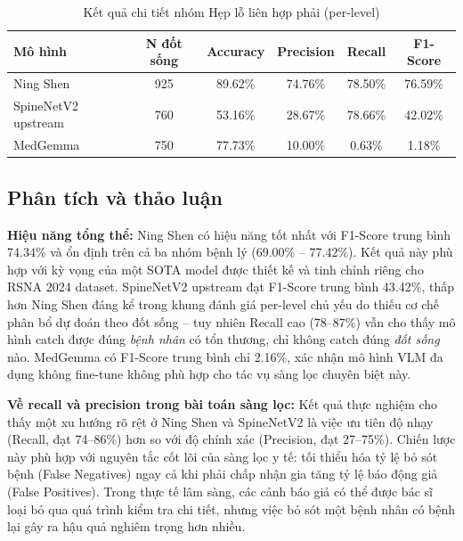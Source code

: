 \begin{table}[h!]
    \centering
    \caption{Kết quả chi tiết nhóm Hẹp lỗ liên hợp phải (per-level)}
    \label{tab:nfn_right_metrics}
    \renewcommand{\arraystretch}{1.2}
    \begin{tabular}{lccccc}
        \toprule
        \textbf{Mô hình} & \textbf{N đốt sống} & \textbf{Accuracy} & \textbf{Precision} & \textbf{Recall} & \textbf{F1-Score} \\
        \midrule
        Ning Shen & 925 & 89.62\% & 74.76\% & 78.50\% & 76.59\% \\
        SpineNetV2 upstream & 760 & 53.16\% & 28.67\% & 78.66\% & 42.02\% \\
        MedGemma & 750 & 77.73\% & 10.00\% & 0.63\% & 1.18\% \\
        \bottomrule
    \end{tabular}
\end{table}

\subsection{Phân tích và thảo luận}

\textbf{Hiệu năng tổng thể:} Ning Shen có hiệu năng tốt nhất với F1-Score trung bình 74.34\% và ổn định trên cả ba nhóm bệnh lý (69.00\% -- 77.42\%). Kết quả này phù hợp với kỳ vọng của một SOTA model được thiết kế và tinh chỉnh riêng cho RSNA 2024 dataset. SpineNetV2 upstream đạt F1-Score trung bình 43.42\%, thấp hơn Ning Shen đáng kể trong khung đánh giá per-level chủ yếu do thiếu cơ chế phân bổ dự đoán theo đốt sống -- tuy nhiên Recall cao (78--87\%) vẫn cho thấy mô hình catch được đúng \textit{bệnh nhân} có tổn thương, chỉ không catch đúng \textit{đốt sống} nào. MedGemma có F1-Score trung bình chỉ 2.16\%, xác nhận mô hình VLM đa dụng không fine-tune không phù hợp cho tác vụ sàng lọc chuyên biệt này.

\textbf{Về recall và precision trong bài toán sàng lọc:}
Kết quả thực nghiệm cho thấy một xu hướng rõ rệt ở Ning Shen và SpineNetV2 là việc ưu tiên độ nhạy (Recall, đạt 74--86\%) hơn so với độ chính xác (Precision, đạt 27--75\%). Chiến lược này phù hợp với nguyên tắc cốt lõi của sàng lọc y tế: tối thiểu hóa tỷ lệ bỏ sót bệnh (False Negatives) ngay cả khi phải chấp nhận gia tăng tỷ lệ báo động giả (False Positives). Trong thực tế lâm sàng, các cảnh báo giả có thể được bác sĩ loại bỏ qua quá trình kiểm tra chi tiết, nhưng việc bỏ sót một bệnh nhân có bệnh lại gây ra hậu quả nghiêm trọng hơn nhiều.

